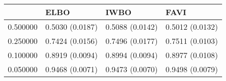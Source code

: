 \begin{tabular}{llll}
\toprule
 & ELBO & IWBO & FAVI \\
\midrule
0.500000 & 0.5030 (0.0187) & 0.5088 (0.0142) & 0.5012 (0.0132) \\
0.250000 & 0.7424 (0.0156) & 0.7496 (0.0177) & 0.7511 (0.0103) \\
0.100000 & 0.8919 (0.0094) & 0.8994 (0.0094) & 0.8977 (0.0108) \\
0.050000 & 0.9468 (0.0071) & 0.9473 (0.0070) & 0.9498 (0.0079) \\
\bottomrule
\end{tabular}

